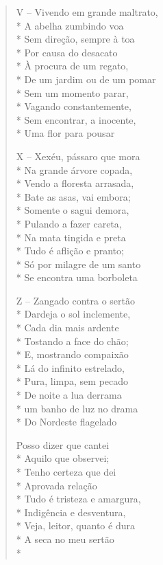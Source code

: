 \begin{verse}
V -- Vivendo em grande maltrato,\\*
A abelha zumbindo voa\\*
Sem direção, sempre à toa\\*
Por causa do desacato\\*
À procura de um regato,\\*
De um jardim ou de um pomar\\*
Sem um momento parar,\\*
Vagando constantemente,\\*
Sem encontrar, a inocente,\\*
Uma flor para pousar

X -- Xexéu, pássaro que mora\\*
Na grande árvore copada,\\*
Vendo a floresta arrasada,\\*
Bate as asas, vai embora;\\*
Somente o sagui demora,\\*
Pulando a fazer careta,\\*
Na mata tingida e preta\\*
Tudo é aflição e pranto;\\*
Só por milagre de um santo\\*
Se encontra uma borboleta

Z -- Zangado contra o sertão\\*
Dardeja o sol inclemente,\\*
Cada dia mais ardente\\*
Tostando a face do chão;\\*
E, mostrando compaixão\\*
Lá do infinito estrelado,\\*
Pura, limpa, sem pecado\\*
De noite a lua derrama\\*
um banho de luz no drama\\*
Do Nordeste flagelado

Posso dizer que cantei\\*
Aquilo que observei;\\*
Tenho certeza que dei\\*
Aprovada relação\\*
Tudo é tristeza e amargura,\\*
Indigência e desventura,\\*
Veja, leitor, quanto é dura\\*
A seca no meu sertão\\*

\end{verse}

